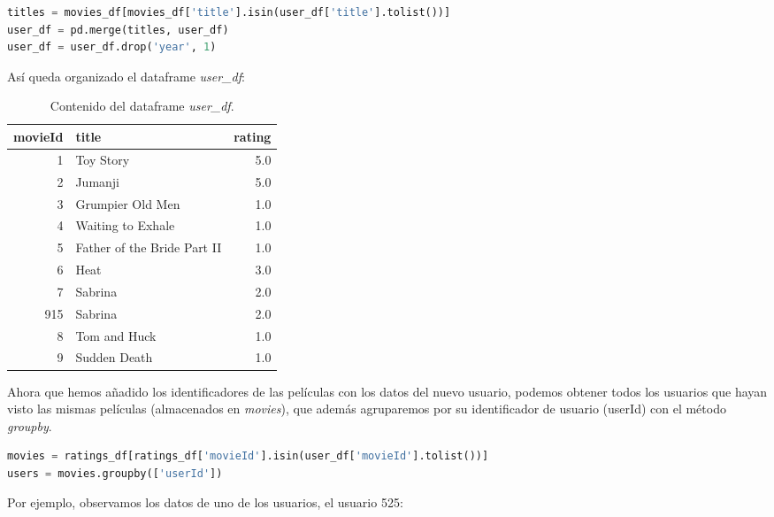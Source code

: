 \documentclass{uimppracticas}
\begin{document}
\begin{lstlisting}[language=python, basicstyle=\small]
titles = movies_df[movies_df['title'].isin(user_df['title'].tolist())]
user_df = pd.merge(titles, user_df)
user_df = user_df.drop('year', 1)
\end{lstlisting}

Así queda organizado el dataframe \textit{user\_df}:

\begin{table}[H]
	\centering
	\begin{tabular}{rlr}
		\toprule
		movieId &                  title &  rating \\
		\midrule
		1 &                    Toy Story &     5.0 \\
		2 &                      Jumanji &     5.0 \\
		3 &             Grumpier Old Men &     1.0 \\
		4 &            Waiting to Exhale &     1.0 \\
		5 &  Father of the Bride Part II &     1.0 \\
		6 &                         Heat &     3.0 \\
		7 &                      Sabrina &     2.0 \\
		915 &                      Sabrina &     2.0 \\
		8 &                 Tom and Huck &     1.0 \\
		9 &                 Sudden Death &     1.0 \\
		\bottomrule
	\end{tabular}
	\caption{Contenido del dataframe \textit{user\_df}.}
	\label{user_df}
\end{table}

Ahora que hemos añadido los identificadores de las películas con los datos del nuevo usuario, podemos obtener todos los usuarios que hayan visto las mismas películas (almacenados en \textit{movies}), que además agruparemos por su identificador de usuario (userId) con el método \textit{groupby}.

\begin{lstlisting}[language=python, basicstyle=\small]
movies = ratings_df[ratings_df['movieId'].isin(user_df['movieId'].tolist())]
users = movies.groupby(['userId'])
\end{lstlisting}

Por ejemplo, observamos los datos de uno de los usuarios, el usuario 525:
\end{document}
